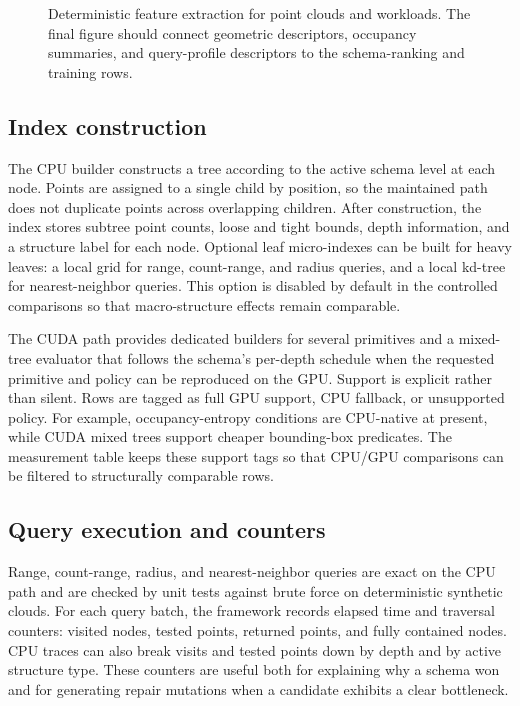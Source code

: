 \begin{figure}[t]
  \centering
  \caption{Deterministic feature extraction for point clouds and workloads. The final figure should connect geometric descriptors, occupancy summaries, and query-profile descriptors to the schema-ranking and training rows.}
  \label{fig:feature-extraction}
\end{figure}

\subsection{Index construction}

The CPU builder constructs a tree according to the active schema level at each node. Points are assigned to a single child by position, so the maintained path does not duplicate points across overlapping children. After construction, the index stores subtree point counts, loose and tight bounds, depth information, and a structure label for each node. Optional leaf micro-indexes can be built for heavy leaves: a local grid for range, count-range, and radius queries, and a local kd-tree for nearest-neighbor queries. This option is disabled by default in the controlled comparisons so that macro-structure effects remain comparable.

The CUDA path provides dedicated builders for several primitives and a mixed-tree evaluator that follows the schema's per-depth schedule when the requested primitive and policy can be reproduced on the GPU. Support is explicit rather than silent. Rows are tagged as full GPU support, CPU fallback, or unsupported policy. For example, occupancy-entropy conditions are CPU-native at present, while CUDA mixed trees support cheaper bounding-box predicates. The measurement table keeps these support tags so that CPU/GPU comparisons can be filtered to structurally comparable rows.

\subsection{Query execution and counters}

Range, count-range, radius, and nearest-neighbor queries are exact on the CPU path and are checked by unit tests against brute force on deterministic synthetic clouds. For each query batch, the framework records elapsed time and traversal counters: visited nodes, tested points, returned points, and fully contained nodes. CPU traces can also break visits and tested points down by depth and by active structure type. These counters are useful both for explaining why a schema won and for generating repair mutations when a candidate exhibits a clear bottleneck.


